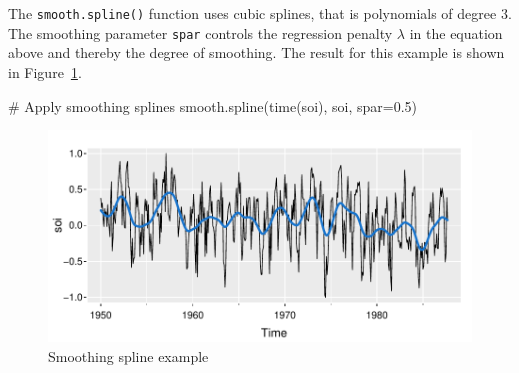 The \texttt{smooth.spline()} function uses cubic splines, that is polynomials of degree $3$. The smoothing parameter \texttt{spar} controls the regression penalty $\lambda$ in the equation above and thereby the degree of smoothing. The result for this example is shown in Figure~\ref{fig:figure17}.

\begin{Rcode}
# Apply smoothing splines
smooth.spline(time(soi), soi, spar=0.5)
\end{Rcode}


\begin{figure}
\centering
\includegraphics[width=.75\textwidth]{figure17.pdf}
\caption{Smoothing spline example}
\label{fig:figure17}
\end{figure}

